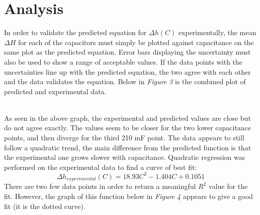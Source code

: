 \documentclass[12pt,letterpaper]{article}
\begin{document}
\section{Analysis}
In order to validate the predicted equation for $\Delta h(C)$ experimentally, the mean $\Delta H$ for each of the capacitors must simply be plotted against capacitance on the same plot as the predicted equation. Error bars displaying the uncertainty must also be used to show a range of acceptable values. If the data points with the uncertainties line up with the predicted equation, the two agree with each other and the data validates the equation. Below in \textit{Figure 3} is the combined plot of predicted and experimental data.
\begin {figure}[htb!]
  \begin{center}
    	\resizebox{0.49\textwidth}{!}{}
  \end	{center}
\end {figure}\\
As seen in the above graph, the experimental and predicted values are close but do not agree exactly. The values seem to be closer for the two lower capacitance points, and then diverge for the third 210 mF point. The data appears to still follow a quadratic trend, the main difference from the predicted function is that the experimental one grows slower with capacitance. Quadratic regression was performed on the experimental data to find a curve of best fit:
\begin{equation}
\Delta h_{experimental}(C) = 18.93C^2 - 1.404C + 0.1051
\end{equation} 
There are two few data points in order to return a meaningful $R^2$ value for the fit. However, the graph of this function below in \textit{Figure 4} appears to give a good fit (it is the dotted curve). 
\begin {figure}[htb!]
  \begin{center}
    	\resizebox{0.49\textwidth}{!}{}
  \end	{center}
\end {figure}
\end{document}
